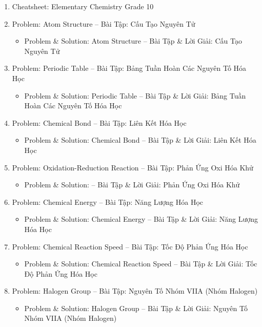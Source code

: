 \documentclass[12pt,oneside]{book}
\begin{document}
\begin{enumerate}
	\item Cheatsheet: Elementary Chemistry Grade 10
	\item Problem: Atom Structure -- Bài Tập: Cấu Tạo Nguyên Tử
	\begin{itemize}
		\item Problem \& Solution: Atom Structure -- Bài Tập \& Lời Giải: Cấu Tạo Nguyên Tử
	\end{itemize}
	\item Problem: Periodic Table -- Bài Tập: Bảng Tuần Hoàn Các Nguyên Tố Hóa Học
	\begin{itemize}
		\item Problem \& Solution: Periodic Table -- Bài Tập \& Lời Giải: Bảng Tuần Hoàn Các Nguyên Tố Hóa Học
	\end{itemize}
	\item Problem: Chemical Bond -- Bài Tập: Liên Kết Hóa Học
	\begin{itemize}
		\item Problem \& Solution: Chemical Bond -- Bài Tập \& Lời Giải: Liên Kết Hóa Học
	\end{itemize}
	\item Problem: Oxidation-Reduction Reaction -- Bài Tập: Phản Ứng Oxi Hóa Khử
	\begin{itemize}
		\item Problem \& Solution: -- Bài Tập \& Lời Giải: Phản Ứng Oxi Hóa Khử
	\end{itemize}
	\item Problem: Chemical Energy -- Bài Tập: Năng Lượng Hóa Học
	\begin{itemize}
		\item Problem \& Solution: Chemical Energy -- Bài Tập \& Lời Giải: Năng Lượng Hóa Học
	\end{itemize}
	\item Problem: Chemical Reaction Speed -- Bài Tập: Tốc Độ Phản Ứng Hóa Học
	\begin{itemize}
		\item Problem \& Solution: Chemical Reaction Speed -- Bài Tập \& Lời Giải: Tốc Độ Phản Ứng Hóa Học
	\end{itemize}
	\item Problem: Halogen Group -- Bài Tập: Nguyên Tố Nhóm VIIA (Nhóm Halogen)
	\begin{itemize}
		\item Problem \& Solution: Halogen Group -- Bài Tập \& Lời Giải: Nguyên Tố Nhóm VIIA (Nhóm Halogen)
	\end{itemize}
\end{enumerate}
\end{document}
